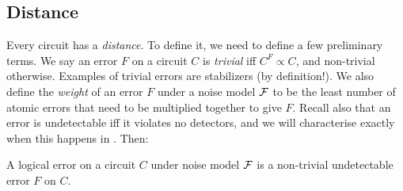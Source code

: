 
\subsection{Distance}\label{subsec:distance}

Every circuit has a \textit{distance}.
To define it, we need to define a few preliminary terms.
We say an error $F$ on a circuit $C$ is \textit{trivial} iff $C^F \propto C$, and non-trivial otherwise.
Examples of trivial errors are stabilizers (by definition!).
We also define the \textit{weight} of an error $F$ under a noise model $\mathcal{F}$ to be the least number of atomic errors that need to be multiplied together to give $F$.
Recall also that an error is undetectable iff it violates no detectors, and we will characterise exactly when this happens in .
Then:

\begin{definition}\label{defn:logical_error}
    A logical error on a circuit $C$ under noise model $\mathcal{F}$ is a non-trivial undetectable error $F$ on $C$.
\end{definition}


